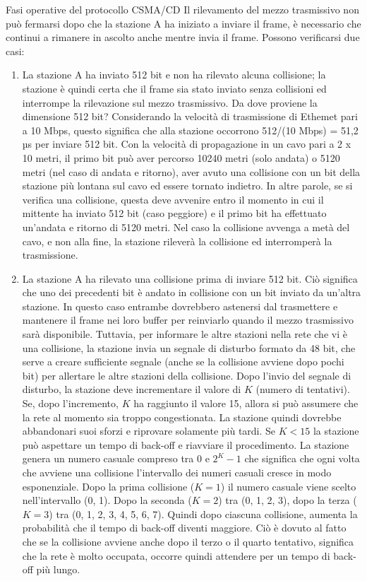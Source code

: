 \begin{Example}{Fasi operative del protocollo CSMA/CD}{}
    Il rilevamento del mezzo trasmissivo non può fermarsi dopo che la stazione A ha iniziato a inviare il frame, è necessario che continui a rimanere in ascolto anche mentre invia il frame. Possono verificarsi due casi:
    \begin{enumerate}
    \item La stazione A ha inviato 512 bit e non ha rilevato alcuna collisione; la stazione è quindi certa che il frame sia stato inviato senza collisioni ed interrompe la rilevazione sul mezzo trasmissivo. Da dove proviene la dimensione 512 bit? Considerando la velocità di trasmissione di Ethemet pari a 10 Mbps, questo significa che alla stazione occorrono 512/(10 Mbps) = 51,2 µs per inviare 512 bit. Con la velocità di propagazione in un cavo pari a 2 x 10 metri, il primo bit può aver percorso 10240 metri (solo andata) o 5120 metri (nel caso di andata e ritorno), aver avuto una collisione con un bit della stazione più lontana sul cavo ed essere tornato indietro. In altre parole, se si verifica una collisione, questa deve avvenire entro il momento in cui il mittente ha inviato 512 bit (caso peggiore) e il primo bit ha effettuato un'andata e ritorno di 5120 metri. Nel caso la collisione avvenga a metà del cavo, e non alla fine, la stazione rileverà la collisione ed interromperà la trasmissione.
    \item La stazione A ha rilevato una collisione prima di inviare 512 bit. Ciò significa che uno dei precedenti bit è andato in collisione con un bit inviato da un'altra stazione. In questo caso entrambe dovrebbero astenersi dal trasmettere e mantenere il frame nei loro buffer per reinviarlo quando il mezzo trasmissivo sarà disponibile. Tuttavia, per informare le altre stazioni nella rete che vi è una collisione, la stazione invia un segnale di disturbo formato da 48 bit, che serve a creare sufficiente segnale (anche se la collisione avviene dopo pochi bit) per allertare le altre stazioni della collisione. Dopo l'invio del segnale di disturbo, la stazione deve incrementare il valore di $K$ (numero di tentativi). Se, dopo l'incremento, $K$ ha raggiunto il valore 15, allora si può assumere che la rete al momento sia troppo congestionata. La stazione quindi dovrebbe abbandonari suoi sforzi e riprovare solamente più tardi. Se $K < 15$ la stazione può aspettare un tempo di back-off e riavviare il procedimento. La stazione genera un numero casuale compreso tra 0 e $2 ^K - 1$ che significa che ogni volta che avviene una collisione l'intervallo dei numeri casuali cresce in modo esponenziale. Dopo la prima collisione ($K = 1$) il numero casuale viene scelto nell'intervallo (0, 1). Dopo la seconda ($K = 2$) tra (0, 1, 2, 3), dopo la terza ($K = 3$) tra (0, 1, 2, 3, 4, 5, 6, 7). Quindi dopo ciascuna collisione, aumenta la probabilità che il tempo di back-off diventi maggiore. Ciò è dovuto al fatto che se la collisione avviene anche dopo il terzo o il quarto tentativo, significa che la rete è molto occupata, occorre quindi attendere per un tempo di back-off più lungo.
    \end{enumerate}
\end{Example}

